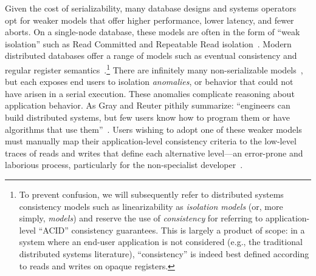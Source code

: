
Given the cost of serializability, many database designs and systems
operators opt for weaker models that offer higher performance, lower
latency, and fewer aborts. On a single-node database, these models are
often in the form of ``weak isolation'' such as Read Committed and
Repeatable Read isolation~\cite{adya-isolation}. Modern distributed
databases offer a range of models such as eventual consistency and
regular register semantics~\cite{hat-vldb}.\footnote{To prevent
  confusion, we will subsequently refer to distributed systems
  consistency models such as linearizability as \textit{isolation
    models} (or, more simply, \textit{models}) and reserve the use of
  \textit{consistency} for referring to application-level ``ACID''
  consistency guarantees. This is largely a product of scope: in a
  system where an end-user application is not considered (e.g., the
  traditional distributed systems literature), ``consistency'' is
  indeed best defined according to reads and writes on opaque
  registers.}  There are infinitely many non-serializable
models~\cite{hat-vldb}, but each exposes end users to isolation
\textit{anomalies}, or behavior that could not have arisen in a serial
execution. These anomalies complicate reasoning about application
behavior. As Gray and Reuter pithily summarize: ``engineers can build
distributed systems, but few users know how to program them or have
algorithms that use them''~\cite{gray-book}. Users wishing to adopt
one of these weaker models must manually map their application-level
consistency criteria to the low-level traces of reads and writes that
define each alternative level---an error-prone and laborious process,
particularly for the non-specialist
developer~\cite{consistency-borders}.


